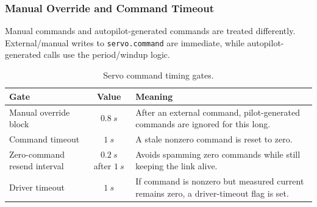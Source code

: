 \documentclass[11pt,twocolumn]{article}
\begin{document}
\subsubsection{Manual Override and Command Timeout}
Manual commands and autopilot-generated commands are treated differently.
External/manual writes to \texttt{servo.command} are immediate, while
autopilot-generated calls use the period/windup logic.
\begin{table}[h]
\centering
\caption{Servo command timing gates.}
\label{tab:pypilot-servo-command-gates}
\begin{tabularx}{\columnwidth}{Z{0.33\columnwidth}cY}
\toprule
Gate & Value & Meaning \\
\midrule
Manual override block &
\(\SI{0.8}{s}\) &
After an external command, pilot-generated commands are ignored for this long. \\
Command timeout &
\(\SI{1}{s}\) &
A stale nonzero command is reset to zero. \\
Zero-command resend interval &
\(\SI{0.2}{s}\) after \(\SI{1}{s}\) &
Avoids spamming zero commands while still keeping the link alive. \\
Driver timeout &
\(\SI{1}{s}\) &
If command is nonzero but measured current remains zero, a driver-timeout flag is set. \\
\bottomrule
\end{tabularx}
\end{table}
\end{document}
